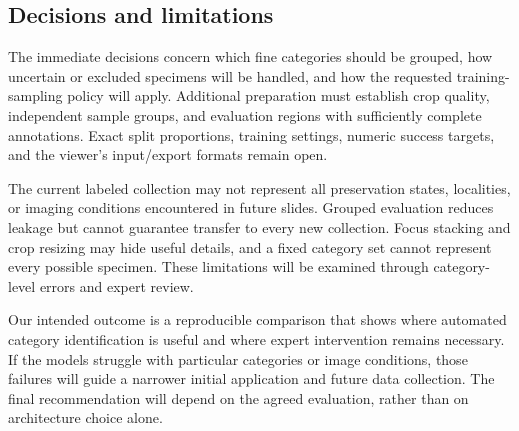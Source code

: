 \documentclass[11pt,letterpaper]{article}
\begin{document}
\subsection{Decisions and limitations}
The immediate decisions concern which fine categories should be grouped, how uncertain or excluded specimens will be handled, and how the requested training-sampling policy will apply. Additional preparation must establish crop quality, independent sample groups, and evaluation regions with sufficiently complete annotations. Exact split proportions, training settings, numeric success targets, and the viewer's input/export formats remain open.

The current labeled collection may not represent all preservation states, localities, or imaging conditions encountered in future slides. Grouped evaluation reduces leakage but cannot guarantee transfer to every new collection. Focus stacking and crop resizing may hide useful details, and a fixed category set cannot represent every possible specimen. These limitations will be examined through category-level errors and expert review.

Our intended outcome is a reproducible comparison that shows where automated category identification is useful and where expert intervention remains necessary. If the models struggle with particular categories or image conditions, those failures will guide a narrower initial application and future data collection. The final recommendation will depend on the agreed evaluation, rather than on architecture choice alone.

\clearpage
{}
{}


\end{document}
